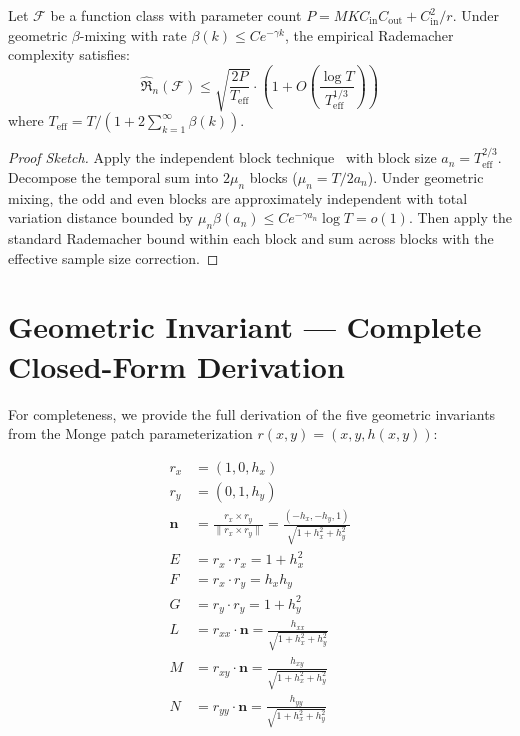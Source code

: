 \begin{lemma}
\label{lem:block-rm}
Let $\mathcal{F}$ be a function class with parameter count $P =
MKC_{\text{in}}C_{\text{out}} + C_{\text{in}}^2/r$. Under geometric
$\beta$-mixing with rate $\beta(k) \leq Ce^{-\gamma k}$, the empirical
Rademacher complexity satisfies:
\begin{equation}
    \hat{\mathfrak{R}}_n(\mathcal{F}) \leq
    \sqrt{\frac{2P}{T_{\text{eff}}}} \cdot
    \left(1 + O\left(\frac{\log T}{T_{\text{eff}}^{1/3}}\right)\right)
\end{equation}
where $T_{\text{eff}} = T / (1 + 2\sum_{k=1}^\infty \beta(k))$.

\begin{proof}[Proof Sketch]
Apply the independent block technique~\cite{yu1994rates} with block size
$a_n = T_{\text{eff}}^{2/3}$. Decompose the temporal sum into $2\mu_n$
blocks ($\mu_n = T / 2a_n$). Under geometric mixing, the odd and even
blocks are approximately independent with total variation distance
bounded by $\mu_n \beta(a_n) \leq Ce^{-\gamma a_n} \log T = o(1)$.
Then apply the standard Rademacher bound within each block and sum across
blocks with the effective sample size correction.
\end{proof}
\end{lemma}

\section{Geometric Invariant — Complete Closed-Form Derivation}

For completeness, we provide the full derivation of the five geometric
invariants from the Monge patch parameterization $r(x,y) = (x, y, h(x,y))$:

\begin{align}
    r_x &= (1, 0, h_x) \\
    r_y &= (0, 1, h_y) \\
    \mathbf{n} &= \frac{r_x \times r_y}{\|r_x \times r_y\|}
    = \frac{(-h_x, -h_y, 1)}{\sqrt{1 + h_x^2 + h_y^2}} \\
    E &= r_x \cdot r_x = 1 + h_x^2 \\
    F &= r_x \cdot r_y = h_x h_y \\
    G &= r_y \cdot r_y = 1 + h_y^2 \\
    L &= r_{xx} \cdot \mathbf{n} = \frac{h_{xx}}{\sqrt{1 + h_x^2 + h_y^2}} \\
    M &= r_{xy} \cdot \mathbf{n} = \frac{h_{xy}}{\sqrt{1 + h_x^2 + h_y^2}} \\
    N &= r_{yy} \cdot \mathbf{n} = \frac{h_{yy}}{\sqrt{1 + h_x^2 + h_y^2}}
\end{align}

